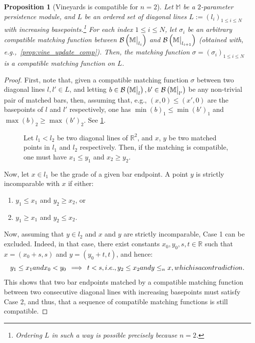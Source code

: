 \documentclass{article}
\newcommand{\barcode}[1]{ {\mathcal B}\left(#1\right) }
\newcommand{\R}{\mathbb{R}}
\newcommand{\Mbb}{\mathbb{M}}
\newcommand{\leqn}{\leq_n}
\newcommand\restr[2]{{  \left.\kern-\nulldelimiterspace #1 \vphantom{\big|} \right|_{#2}  }}
\newtheorem{proposition}[theorem]{Proposition}%
\begin{document}
\begin{proposition}[Vineyards is compatible for $n=2$]\label{prop:vine_compat}
	Let $\Mbb$ be a $2$-parameter persistence module, and $L$ be an ordered set of diagonal
	lines $L:=(l_i)_{1\le i\le N}$ with
	increasing basepoints.\footnote{Ordering $L$ in such a way is possible precisely because $n=2$.} %
	For each index $1\le i\le N$, let $\sigma_i$ be an arbitrary compatible matching function between $\barcode{\restr{\Mbb}{l_i}}$ and
	$\barcode{\restr{\Mbb}{l_{i+1}}}$ (obtained with, e.g.,~\cref{prop:vine_update_comp}).
	Then, the matching function $\sigma = (\sigma_i)_{1\le i \le N}$ is a compatible
	matching function on $L$.
\end{proposition}

\begin{proof}
	First, note that, given a compatible matching function
	$\sigma$ between two diagonal lines $l,l'\in L$, and letting
	$b\in\barcode{\restr{\Mbb}{l}},b'\in\barcode{\restr{\Mbb}{l'}}$ be any
	non-trivial pair of matched bars,
	then, assuming that, e.g., $(x,0)\le (x',0)$ are the basepoints of
	$l$ and $l'$ respectively, one has $\min (b)_1\le \min(b')_1$ and $\max(b)_2
	\ge \max(b')_2$.
	See \cref{fig:2d_compatible}. %
	\begin{figure}[H]
		\centering
		
		\caption{Let $l_1 < l_2$ be two diagonal lines of $\mathbb{R}^2$, and $x$,
			$y$ be two matched points in $l_1$ and $l_2$ respectively.
		Then, if the matching is compatible, one must have $x_1 \le y_1$ and $x_2 \ge y_2$.}
		\label{fig:2d_compatible}
	\end{figure}

	Now, let $x\in l_1$ be the grade of a given bar endpoint. A point $y$ is strictly incomparable with $x$ if either:
	\begin{enumerate}
		\item $y_1 \le x_1$ and $y_2 \ge x_2$, or
		\item $y_1 \ge x_1$ and $y_2 \le x_2$.
	\end{enumerate}
	Now, assuming that $y\in l_2$ and $x$ and $y$ are strictly incomparable, Case 1 can be excluded. Indeed, in that case,
	there exist constants $x_0,y_0,s,t\in \R$ such that
	$x= (x_0+s,s)$ and $y=(y_0+t,t)$, and hence:
	\begin{equation*}
		y_1\le x_1 \textnormal{ and } x_0<y_0 \,\implies\, t<s, \textnormal{ i.e., } y_2\le x_2 \textnormal{ and } y\leqn x\textnormal{, which is a contradiction}.
	\end{equation*}
	This shows that two bar endpoints matched by a compatible matching function
	between two consecutive diagonal lines with increasing basepoints must satisfy Case 2, and thus, that a sequence of compatible matching functions is still compatible.
\end{proof}
\end{document}
